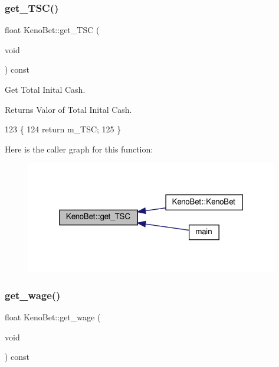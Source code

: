 \subsubsection{\texorpdfstring{get\+\_\+\+T\+S\+C()}{get\_TSC()}}
{\footnotesize\ttfamily float Keno\+Bet\+::get\+\_\+\+T\+SC (\begin{DoxyParamCaption}\item[{void}]{ }\end{DoxyParamCaption}) const}



Get Total Inital Cash. 

\begin{DoxyReturn}{Returns}
Valor of Total Inital Cash. 
\end{DoxyReturn}

\begin{DoxyCode}
123 \{
124     \textcolor{keywordflow}{return} m\_TSC;
125 \}
\end{DoxyCode}
Here is the caller graph for this function\+:
\nopagebreak
\begin{figure}[H]
\begin{center}
\leavevmode
\includegraphics[width=313pt]{classKenoBet_a15782d60d2e9b76f359963865a714a04_icgraph}
\end{center}
\end{figure}
\mbox{\label{classKenoBet_a65f0348e49dd8a2e2dddfcc9a1f05a65}} 
\subsubsection{\texorpdfstring{get\+\_\+wage()}{get\_wage()}}
{\footnotesize\ttfamily float Keno\+Bet\+::get\+\_\+wage (\begin{DoxyParamCaption}\item[{void}]{ }\end{DoxyParamCaption}) const}



